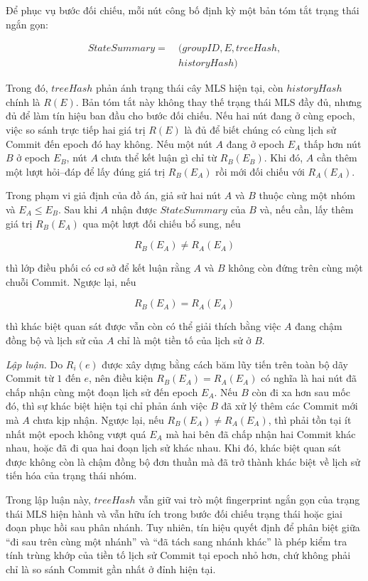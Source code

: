 \documentclass[../DoAn.tex]{subfiles}
\begin{document}
Để phục vụ bước đối chiếu, mỗi nút công bố định kỳ một bản tóm tắt trạng thái ngắn gọn:

\[
\begin{split}
StateSummary =\ & (groupID, E, treeHash, \\
                & historyHash)
\end{split}
\]

Trong đó, $treeHash$ phản ánh trạng thái cây MLS hiện tại, còn $historyHash$ chính là $R(E)$. Bản tóm tắt này không thay thế trạng thái MLS đầy đủ, nhưng đủ để làm tín hiệu ban đầu cho bước đối chiếu. Nếu hai nút đang ở cùng epoch, việc so sánh trực tiếp hai giá trị $R(E)$ là đủ để biết chúng có cùng lịch sử Commit đến epoch đó hay không. Nếu một nút $A$ đang ở epoch $E_A$ thấp hơn nút $B$ ở epoch $E_B$, nút $A$ chưa thể kết luận gì chỉ từ $R_B(E_B)$. Khi đó, $A$ cần thêm một lượt hỏi--đáp để lấy đúng giá trị $R_B(E_A)$ rồi mới đối chiếu với $R_A(E_A)$.

\begin{proposition}
\label{prop:fork_detection}
Trong phạm vi giả định của đồ án, giả sử hai nút $A$ và $B$ thuộc cùng một nhóm và $E_A \leq E_B$. Sau khi $A$ nhận được $StateSummary$ của $B$ và, nếu cần, lấy thêm giá trị $R_B(E_A)$ qua một lượt đối chiếu bổ sung, nếu

\[
R_B(E_A) \neq R_A(E_A)
\]

thì lớp điều phối có cơ sở để kết luận rằng $A$ và $B$ không còn đứng trên cùng một chuỗi Commit. Ngược lại, nếu

\[
R_B(E_A) = R_A(E_A)
\]

thì khác biệt quan sát được vẫn còn có thể giải thích bằng việc $A$ đang chậm đồng bộ và lịch sử của $A$ chỉ là một tiền tố của lịch sử ở $B$.
\end{proposition}

\textit{Lập luận.} Do $R_i(e)$ được xây dựng bằng cách băm lũy tiến trên toàn bộ dãy Commit từ $1$ đến $e$, nên điều kiện $R_B(E_A) = R_A(E_A)$ có nghĩa là hai nút đã chấp nhận cùng một đoạn lịch sử đến epoch $E_A$. Nếu $B$ còn đi xa hơn sau mốc đó, thì sự khác biệt hiện tại chỉ phản ánh việc $B$ đã xử lý thêm các Commit mới mà $A$ chưa kịp nhận. Ngược lại, nếu $R_B(E_A) \neq R_A(E_A)$, thì phải tồn tại ít nhất một epoch không vượt quá $E_A$ mà hai bên đã chấp nhận hai Commit khác nhau, hoặc đã đi qua hai đoạn lịch sử khác nhau. Khi đó, khác biệt quan sát được không còn là chậm đồng bộ đơn thuần mà đã trở thành khác biệt về lịch sử tiến hóa của trạng thái nhóm.

Trong lập luận này, $treeHash$ vẫn giữ vai trò một fingerprint ngắn gọn của trạng thái MLS hiện hành và vẫn hữu ích trong bước đối chiếu trạng thái hoặc giai đoạn phục hồi sau phân nhánh. Tuy nhiên, tín hiệu quyết định để phân biệt giữa ``đi sau trên cùng một nhánh'' và ``đã tách sang nhánh khác'' là phép kiểm tra tính trùng khớp của tiền tố lịch sử Commit tại epoch nhỏ hơn, chứ không phải chỉ là so sánh Commit gần nhất ở đỉnh hiện tại.
\end{document}
